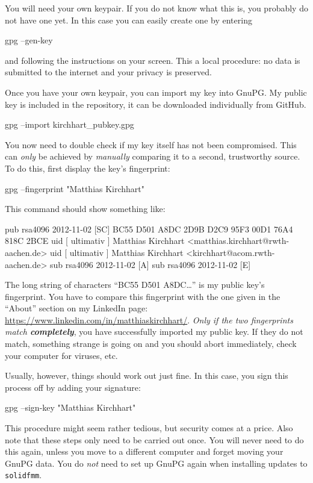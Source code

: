 \documentclass{scrbook}
\newcommand{\solidfmm}{\texttt{solidfmm}}
\begin{document}
You will need your own keypair. If you do not know what this is, you probably
do not have one yet. In this case you can easily create one by entering
\begin{commandshell*}
gpg --gen-key
\end{commandshell*}
and following the instructions on your screen. This a local procedure: no data
is submitted to the internet and your privacy is preserved.

Once you have your own keypair, you can import my key into GnuPG. My public
key is included in the repository, it can be downloaded individually from
GitHub.
\begin{commandshell*}
gpg --import kirchhart_pubkey.gpg
\end{commandshell*}
You now need to double check if my key itself has not been compromised. This
can \emph{only} be achieved by \emph{manually} comparing it to a second,
trustworthy source. To do this, first display the key's fingerprint:
\begin{commandshell*}
gpg --fingerprint "Matthias Kirchhart"
\end{commandshell*}
This command should show something like:
\begin{commandshell*}
pub   rsa4096 2012-11-02 [SC]
      BC55 D501 A8DC 2D9B D2C9  95F3 00D1 76A4 818C 2BCE
uid        [ ultimativ ] Matthias Kirchhart <matthias.kirchhart@rwth-aachen.de>
uid        [ ultimativ ] Matthias Kirchhart <kirchhart@acom.rwth-aachen.de>
sub   rsa4096 2012-11-02 [A]
sub   rsa4096 2012-11-02 [E]
\end{commandshell*}
The long string of characters \enquote{BC55 D501 A8DC…} is my public key's
fingerprint. You have to compare this fingerprint with the one given in the
\enquote{About} section on my LinkedIn page:
\url{https://www.linkedin.com/in/matthiaskirchhart/}.
\emph{Only if the two fingerprints match \textbf{completely}}, you have
successfully imported my public key. If they do not match, something strange
is going on and you should abort immediately, check your computer for viruses,
etc.

Usually, however, things should work out just fine. In this case, you sign this
process off by adding your signature:
\begin{commandshell*}
gpg --sign-key "Matthias Kirchhart"
\end{commandshell*}
This procedure might seem rather tedious, but security comes at a price. Also
note  that these steps only need to be carried out once. You will never need to
do this again, unless you move to a different computer and forget moving your
GnuPG data. You do \emph{not} need to set up GnuPG again when installing
updates to \solidfmm.
\end{document}
